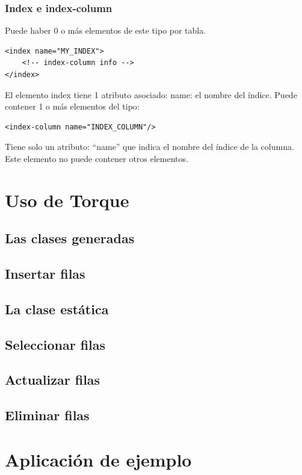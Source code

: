 \documentclass[24pt, a4paper, oneside, spanish]{beamer}
\begin{document}
			\begin{frame}
				\frametitle{Index e index-column}
				
				Puede haber 0 o más elementos de este tipo por tabla.

\begin{lstlisting}
<index name="MY_INDEX">
	<!-- index-column info -->
</index>
\end{lstlisting}

El elemento index tiene 1 atributo asociado:
name: el nombre del índice. 
Puede contener 1 o más elementos  del tipo:

\begin{lstlisting}
<index-column name="INDEX_COLUMN"/>
\end{lstlisting}

Tiene solo un atributo: “name” que indica el nombre del índice de la columna. Este elemento no puede contener otros elementos.
			\end{frame}	
			
\section{Uso de Torque}
	\subsection{Las clases generadas}
	\subsection{Insertar filas}
	\subsection{La clase estática}
	\subsection{Seleccionar filas}
	\subsection{Actualizar filas}
	\subsection{Eliminar filas}
	
\section{Aplicación de ejemplo}
\end{document}
